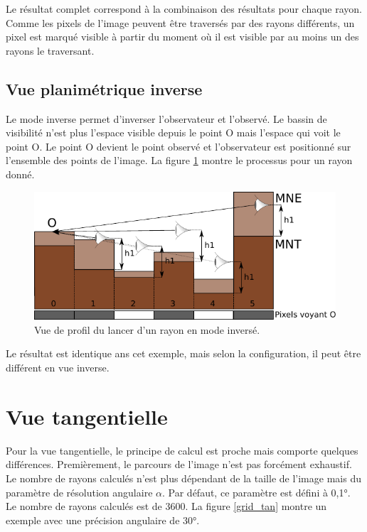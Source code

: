 \documentclass{report}
\begin{document}
Le résultat complet correspond à la combinaison des résultats pour chaque rayon.
Comme les pixels de l'image peuvent être traversés par des rayons différents, un pixel est marqué visible à partir du moment où il est visible par au moins un des rayons le traversant.

\subsection{Vue planimétrique inverse}

Le mode inverse permet d'inverser l'observateur et l'observé. Le bassin de visibilité n'est plus l'espace visible depuis le point O mais l'espace qui voit le point O. Le point O devient le point observé et l'observateur est positionné sur l'ensemble des points de l'image. La figure \ref{ray_side_inverse} montre le processus pour un rayon donné. 

\begin{figure}[H]
	\includegraphics{img/ray_side_inverse-fr.pdf} 
	\caption{Vue de profil du lancer d'un rayon en mode inversé.}
	\label{ray_side_inverse}
\end{figure}

Le résultat est identique ans cet exemple, mais selon la configuration, il peut être différent en vue inverse.

\section{Vue tangentielle}
\label{principles_tan}
Pour la vue tangentielle, le principe de calcul est proche mais comporte quelques différences. Premièrement, le parcours de l'image n'est pas forcément exhaustif. Le nombre de rayons calculés n'est plus dépendant de la taille de l'image mais du paramètre de résolution angulaire $\alpha$. Par défaut, ce paramètre est défini à 0,1°. Le nombre de rayons calculés est de 3600. La figure \ref{grid_tan} montre un exemple avec une précision angulaire de 30°.
\end{document}
